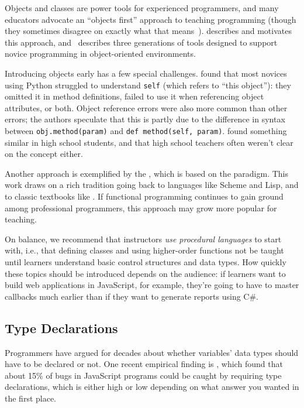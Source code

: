 Objects and classes are power tools for experienced programmers, and
many educators advocate an ``objects first'' approach to teaching
programming (though they sometimes disagree on exactly what that means~\cite{Benn2007b}).
\cite{Sorv2014} describes and motivates this
approach, and~\cite{Koll2015} describes three generations of tools
designed to support novice programming in object-oriented environments.

Introducing objects early has a few special challenges.
\cite{Mill2016b} found that most novices using Python struggled to
understand \texttt{self} (which refers to ``this object''): they omitted it in
method definitions, failed to use it when referencing object attributes,
or both. Object reference errors were also more common than other
errors; the authors speculate that this is partly due to the difference
in syntax between \texttt{obj.method(param)} and \texttt{def\ method(self,\ param)}.
\cite{Rago2017} found something similar in high school students, and
that high school teachers often weren't clear on the concept either.

Another approach is exemplified by the ,
which is based on the  paradigm. This work draws on a
rich tradition going back to languages like Scheme and Lisp, and to
classic textbooks like
\cite{Fell2001,Frie1995,Abel1996}. If functional
programming continues to gain ground among professional programmers,
this approach may grow more popular for teaching.

On balance, we recommend that instructors \emph{use procedural languages} to
start with, i.e., that defining classes and using higher-order functions
not be taught until learners understand basic control structures and
data types. How quickly these topics should be introduced depends on the
audience: if learners want to build web applications in JavaScript, for
example, they're going to have to master callbacks much earlier than if
they want to generate reports using C\#.

\subsection*{Type Declarations}

Programmers have argued for decades about whether variables' data types
should have to be declared or not. One recent empirical finding is
\cite{Gao2017}, which found that about 15\% of bugs in JavaScript
programs could be caught by requiring type declarations, which is either
high or low depending on what answer you wanted in the first place.

